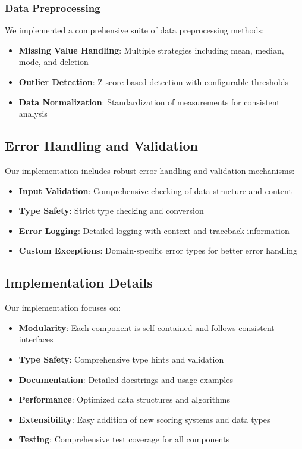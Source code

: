 \documentclass[12pt]{article}
\begin{document}
\subsubsection{Data Preprocessing}

We implemented a comprehensive suite of data preprocessing methods:
\begin{itemize}
    \item \textbf{Missing Value Handling}: Multiple strategies including mean, median, mode, and deletion
    \item \textbf{Outlier Detection}: Z-score based detection with configurable thresholds
    \item \textbf{Data Normalization}: Standardization of measurements for consistent analysis
\end{itemize}

\subsection{Error Handling and Validation}

Our implementation includes robust error handling and validation mechanisms:
\begin{itemize}
    \item \textbf{Input Validation}: Comprehensive checking of data structure and content
    \item \textbf{Type Safety}: Strict type checking and conversion
    \item \textbf{Error Logging}: Detailed logging with context and traceback information
    \item \textbf{Custom Exceptions}: Domain-specific error types for better error handling
\end{itemize}

\subsection{Implementation Details}

Our implementation focuses on:
\begin{itemize}
    \item \textbf{Modularity}: Each component is self-contained and follows consistent interfaces
    \item \textbf{Type Safety}: Comprehensive type hints and validation
    \item \textbf{Documentation}: Detailed docstrings and usage examples
    \item \textbf{Performance}: Optimized data structures and algorithms
    \item \textbf{Extensibility}: Easy addition of new scoring systems and data types
    \item \textbf{Testing}: Comprehensive test coverage for all components
\end{itemize}
\end{document}
